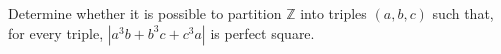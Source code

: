 Determine whether it is possible to partition $\mathbb{Z}$ into triples $(a,b,c)$ such that, for every triple, $|a^3b + b^3c + c^3a|$ is perfect square.